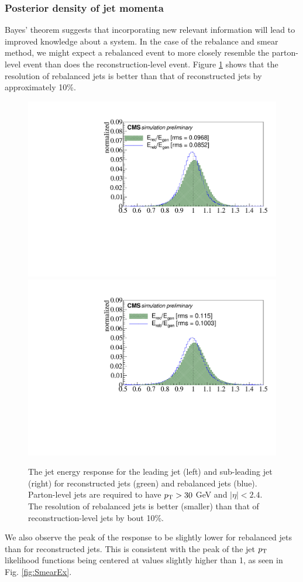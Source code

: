 \subsubsection{Posterior density of jet momenta}
Bayes' theorem suggests that incorporating new relevant information will lead to improved knowledge about a system. In the case of the rebalance and smear method, we might expect a rebalanced event to more closely resemble the parton-level event than does the reconstruction-level event. Figure \ref{fig:rebareso} shows that the resolution of rebalanced jets is better than that of reconstructed jets by approximately 10\%.
\begin{figure}[h]
\centering
\includegraphics[width=0.49\linewidth]{figures/SusySearches/Ra2b2016/Jet1Resolution.pdf}
\includegraphics[width=0.49\linewidth]{figures/SusySearches/Ra2b2016/Jet2Resolution.pdf}
\caption{The jet energy response for the leading jet (left) and sub-leading jet (right) for reconstructed jets (green) and rebalanced jets (blue). Parton-level jets are required to have $p_{\text{T}}>30$ GeV and $|\eta|<2.4$. The resolution of rebalanced jets is better (smaller) than that of reconstruction-level jets by bout 10\%.}
\label{fig:rebareso}
\end{figure}
We also observe the peak of the response to be slightly lower for rebalanced jets than for reconstructed jets. This is consistent with the peak of the jet $p_{\text{T}}$ likelihood functions being centered at values slightly higher than 1, as seen in Fig. \ref{fig:SmearEx}. 
\FloatBarrier

